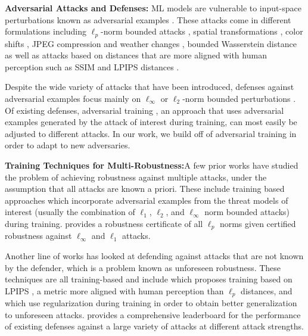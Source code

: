 
\textbf{Adversarial Attacks and Defenses:} ML models are vulnerable to input-space perturbations known as adversarial examples \citep{szegedy2013intriguing}.  These attacks come in different formulations including $\ell_p$-norm bounded attacks \citep{madry2017towards, carlini2017towards}, spatial transformations \citep{XiaoZ0HLS18}, color shifts \citep{LaidlawF19}, JPEG compression and weather changes \citep{kaufmann2019testing}, bounded Wasserstein distance \citep{wasserstein_attacks, wu2020stronger} as well as attacks based on distances that are more aligned with human perception such as SSIM \citep{GRAGNANIELLO2021142} and LPIPS distances \citep{laidlaw2020perceptual, ghazanfari2023r}.

Despite the wide variety of attacks that have been introduced, defenses against adversarial examples focus mainly on $\ell_{\infty}$ or $\ell_2$-norm bounded perturbations \citep{cohen2019certified, zhang2020towards, madry2017towards, zhang2019theoretically, croce2020robustbench}.  Of existing defenses, adversarial training \citep{madry2017towards}, an approach that uses adversarial examples generated by the attack of interest during training, can most easily be adjusted to different attacks.  In our work, we build off of adversarial training in order to adapt to new adversaries.

\textbf{Training Techniques for Multi-Robustness:}A few prior works have studied the problem of achieving robustness against multiple attacks, under the assumption that all attacks are known a priori.  These include training based approaches \citep{MainiWK20, TB19, madaan2020learning} which incorporate adversarial examples from the threat models of interest (usually the combination of $\ell_1$, $\ell_2$, and $\ell_\infty$ norm bounded attacks) during training.  \citet{Croce020} provides a robustness certificate of all $\ell_p$ norms given certified robustness against $\ell_\infty$ and $\ell_1$ attacks.

Another line of works has looked at defending against attacks that are not known by the defender, which is a problem known as unforeseen robustness.  These techniques are all training-based and include \citet{laidlaw2020perceptual} which proposes training based on LPIPS \citep{zhang2018lpips}, a metric more aligned with human perception than $\ell_p$ distances, and \citet{dai2022formulating, jin2020manifold} which use regularization during training in order to obtain better generalization to unforeseen attacks.  \citet{dai2023multirobustbench} provides a comprehensive leaderboard for the performance of existing defenses against a large variety of attacks at different attack strengths.


